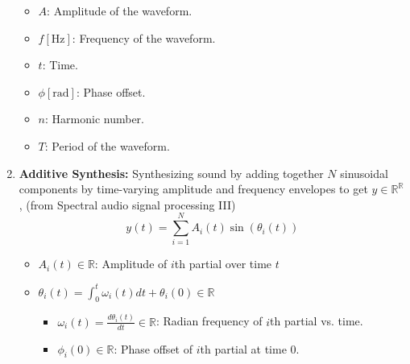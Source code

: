 \documentclass[12pt]{article}
\begin{document}
\begin{enumerate}
    \begin{itemize}
        \item \( A \): Amplitude of the waveform.
        \item \( f [\text{Hz}]\): Frequency of the waveform.
        \item \( t \): Time.
        \item \( \phi [\text{rad}]\): Phase offset.
        \item \( n \): Harmonic number.
        \item \( T \): Period of the waveform.
    \end{itemize}
    \item \textbf{Additive Synthesis:} Synthesizing sound by adding together $N$ sinusoidal components by time-varying amplitude and frequency envelopes to get $y \in \mathbb{R}^{\mathbb{R}}$, (from Spectral audio signal processing III)
    \begin{equation}
        y(t) = \sum_{i=1}^{N} A_i(t) \sin\left(\theta_i (t)\right)
    \end{equation}
    \begin{itemize}
        \item $A_i(t) \in \mathbb{R}$: Amplitude of $i$th partial over time $t$
        \item $\theta_i (t) = \int_0^t \omega_i(t)dt + \theta_i(0) \in \mathbb{R}$
        \begin{itemize}
            \item $\omega_i(t)=\frac{d\theta_i(t)}{dt} \in \mathbb{R}$: Radian frequency of $i$th partial vs. time.
            \item $\phi_i(0) \in \mathbb{R}$: Phase offset of $i$th partial at time $0$.
        \end{itemize}
    \end{itemize}
\end{enumerate}
\end{document}
